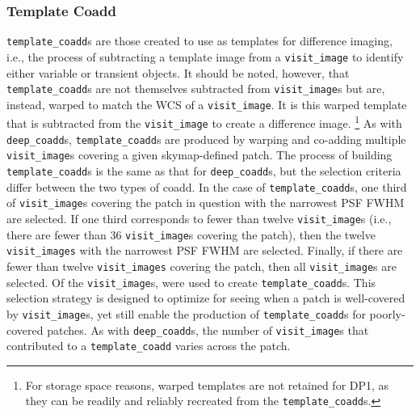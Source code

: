 \subsubsection{Template Coadd}
\texttt{template\_coadd}s \citep{10.71929/rubin/2570314} are those created to use as templates for difference imaging, i.e., the process of subtracting a template image from a \texttt{visit\_image} to identify either variable or \gls{transient} objects. It should be noted, however, that \texttt{template\_coadd}s are not themselves subtracted from \texttt{visit\_image}s but are, instead, warped to match the \gls{WCS} of a \texttt{visit\_image}.
It is this warped template that is subtracted from the \texttt{visit\_image} to create a difference image.
\footnote{For storage space reasons, warped templates are not retained for \gls{DP1}, as they can be readily and reliably recreated from the \texttt{template\_coadd}s.}
As with \texttt{deep\_coadd}s, \texttt{template\_coadd}s are produced by warping and co-adding multiple \texttt{visit\_image}s covering a given skymap-defined \gls{patch}.
The process of building \texttt{template\_coadd}s is the same as that for \texttt{deep\_coadd}s, but the selection criteria differ between the two types of coadd.
In the case of \texttt{template\_coadd}s, one third of \texttt{visit\_image}s covering the \gls{patch} in question with the narrowest \gls{PSF} \gls{FWHM} are selected.
If one third corresponds to fewer than twelve \texttt{visit\_image}s (i.e., there are fewer than 36 \texttt{visit\_image}s covering the \gls{patch}), then the twelve \texttt{visit\_images} with the narrowest \gls{PSF} \gls{FWHM} are selected.
Finally, if there are fewer than twelve \texttt{visit\_images} covering the \gls{patch}, then all \texttt{visit\_image}s are selected.
Of the \nvisitimages \texttt{visit\_image}s, \ntemplatecoaddvisitimages were used to create \texttt{template\_coadd}s.
This selection strategy is designed to optimize for \gls{seeing} when a \gls{patch} is well-covered by \texttt{visit\_image}s, yet still enable the production of \texttt{template\_coadd}s for poorly-covered patches.
As with \texttt{deep\_coadd}s, the number of \texttt{visit\_image}s that contributed to a \texttt{template\_coadd} varies across the patch.

